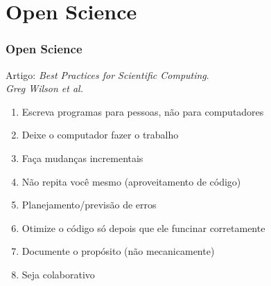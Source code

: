 \section{Open Science}

\begin{frame}
  \frametitle{Open Science}
  Artigo: \textit{Best Practices for Scientific Computing}. \\
          \textit{Greg Wilson et al.}
  \begin{enumerate}
    \item Escreva programas para pessoas, não para computadores
    \item Deixe o computador fazer o trabalho
    \item Faça mudanças incrementais
    \item Não repita você mesmo (aproveitamento de código)
    \item Planejamento/previsão de erros 
    \item Otimize o código só depois que ele funcinar corretamente
    \item Documente o propósito (não mecanicamente)
    \item Seja colaborativo
  \end{enumerate}
\end{frame}
